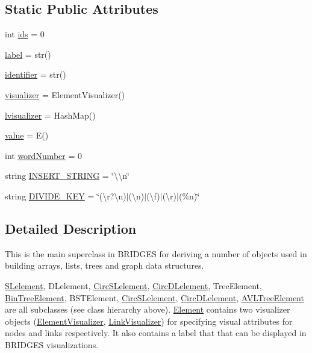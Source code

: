 \subsection*{Static Public Attributes}
\begin{DoxyCompactItemize}
\item 
int \hyperlink{class_element_1_1_element_a219a21d962bfef58ad39c9762876588f}{ids} = 0
\item 
\hyperlink{class_element_1_1_element_a1eaadb79747dd83097612cac742976fa}{label} = str()
\item 
\hyperlink{class_element_1_1_element_a2202a62a079908d52afc0b7796be2981}{identifier} = str()
\item 
\hyperlink{class_element_1_1_element_a7a5b8e1891bf065fa81f51a8f6b4212e}{visualizer} = Element\+Visualizer()
\item 
\hyperlink{class_element_1_1_element_a130630f8ecfe9255c9e0a514949be201}{lvisualizer} = Hash\+Map()
\item 
\hyperlink{class_element_1_1_element_ae9c30f7574a4356686d93e4567cf61f8}{value} = E()
\item 
int \hyperlink{class_element_1_1_element_a58cc88e7f79da391e25e4fa98845b8cc}{word\+Number} = 0
\item 
string \hyperlink{class_element_1_1_element_a346648cd57ba439d8b4913a645ab81ba}{I\+N\+S\+E\+R\+T\+\_\+\+S\+T\+R\+I\+NG} = \char`\"{}\textbackslash{}\textbackslash{}n\char`\"{}
\item 
string \hyperlink{class_element_1_1_element_ae06a0f0ca0e5499c532f2550cf1ffea6}{D\+I\+V\+I\+D\+E\+\_\+\+K\+EY} = \char`\"{}(\textbackslash{}r?\textbackslash{}n)$\vert$(\textbackslash{}n)$\vert$(\textbackslash{}f)$\vert$(\textbackslash{}r)$\vert$(\%n)\char`\"{}
\end{DoxyCompactItemize}


\subsection{Detailed Description}
This is the main superclass in B\+R\+I\+D\+G\+ES for deriving a number of objects used in building arrays, lists, trees and graph data structures. 

\hyperlink{namespace_s_lelement}{S\+Lelement}, D\+Lelement, \hyperlink{namespace_circ_s_lelement}{Circ\+S\+Lelement}, \hyperlink{namespace_circ_d_lelement}{Circ\+D\+Lelement}, Tree\+Element, \hyperlink{namespace_bin_tree_element}{Bin\+Tree\+Element}, B\+S\+T\+Element, \hyperlink{namespace_circ_s_lelement}{Circ\+S\+Lelement}, \hyperlink{namespace_circ_d_lelement}{Circ\+D\+Lelement}, \hyperlink{namespace_a_v_l_tree_element}{A\+V\+L\+Tree\+Element} are all subclasses (see class hierarchy above). \hyperlink{class_element_1_1_element}{Element} contains two visualizer objects (\hyperlink{namespace_element_visualizer}{Element\+Visualizer}, \hyperlink{namespace_link_visualizer}{Link\+Visualizer}) for specifying visual attributes for nodes and links respectively. It also contains a label that that can be displayed in B\+R\+I\+D\+G\+ES visualizations.

